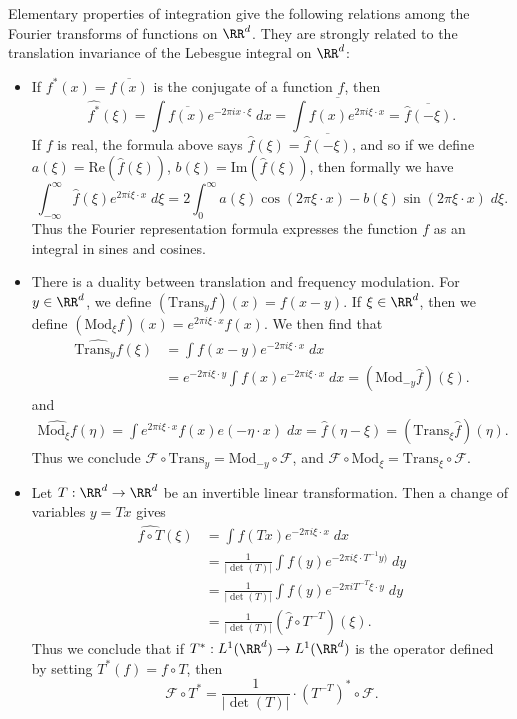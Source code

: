 Elementary properties of integration give the following relations among the Fourier transforms of functions on $\RR^d$. They are strongly related to the translation invariance of the Lebesgue integral on $\RR^d$:
%
\begin{itemize}
    \item If $f^*(x) = \overline{f(x)}$ is the conjugate of a function $f$, then
    \[ \widehat{f^*}(\xi) = \int \overline{f(x)} e^{-2 \pi i x \cdot \xi}\; dx = \overline{\int f(x) e^{2 \pi i \xi \cdot x}} = \overline{\widehat{f}(-\xi)}. \]
    If $f$ is real, the formula above says $\widehat{f}(\xi) = \overline{\widehat{f}(-\xi)}$, and so if we define $a(\xi) = \text{Re}(\widehat{f}(\xi))$, $b(\xi) = \text{Im}(\widehat{f}(\xi))$, then formally we have
    \[ \int_{-\infty}^\infty \widehat{f}(\xi) e^{2 \pi i \xi \cdot x}\; d\xi = 2 \int_0^\infty a(\xi) \cos(2 \pi \xi \cdot x) - b(\xi) \sin(2 \pi \xi \cdot x)\; d\xi. \]
    Thus the Fourier representation formula expresses the function $f$ as an integral in sines and cosines.
    
    \item There is a duality between translation and frequency modulation. For $y \in \RR^d$, we define $(\text{Trans}_y f)(x) = f(x - y)$. If $\xi \in \RR^d$, then we define $(\text{Mod}_\xi f)(x) = e^{2 \pi i \xi \cdot x} f(x)$. We then find that
    \begin{align*}
        \widehat{\text{Trans}_y f}(\xi) &= \int f(x - y) e^{-2\pi i \xi \cdot x}\; dx\\
        &= e^{- 2 \pi i \xi \cdot y} \int f(x) e^{- 2 \pi i \xi \cdot x}\; dx = (\text{Mod}_{-y} \widehat{f})(\xi).
    \end{align*}
    and
    \begin{align*}
        \widehat{\text{Mod}_\xi f}(\eta) = \int e^{2 \pi i \xi \cdot x} f(x) e(- \eta \cdot x)\; dx = \widehat{f}(\eta - \xi) = (\text{Trans}_\xi \widehat{f})(\eta).
    \end{align*}
    Thus we conclude $\mathcal{F} \circ \text{Trans}_y = \text{Mod}_{-y} \circ \mathcal{F}$, and $\mathcal{F} \circ \text{Mod}_\xi = \text{Trans}_\xi \circ \mathcal{F}$.

    \item Let $T: \RR^d \to \RR^d$ be an invertible linear transformation. Then a change of variables $y = Tx$ gives
    \begin{align*}
        \widehat{f \circ T}(\xi) &= \int f(Tx) e^{-2 \pi i \xi \cdot x}\; dx\\
        &= \frac{1}{|\det(T)|} \int f(y) e^{-2 \pi i \xi \cdot T^{-1}y)}\; dy\\
        &= \frac{1}{|\det(T)|} \int f(y) e^{- 2 \pi i T^{-T} \xi \cdot y}\; dy\\
        &= \frac{1}{|\det(T)|} (\widehat{f} \circ T^{-T})(\xi).
    \end{align*}
    Thus we conclude that if $T^*: L^1(\RR^d) \to L^1(\RR^d)$ is the operator defined by setting $T^*(f) = f \circ T$, then 
    \[ \mathcal{F} \circ T^* = \frac{1}{|\det(T)|} \cdot (T^{-T})^* \circ \mathcal{F}. \]


\end{itemize}
